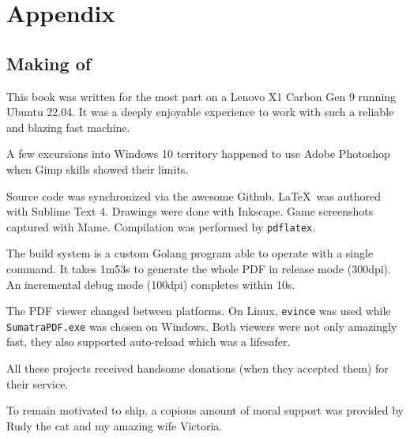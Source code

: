 \chapter{Appendix} 

\section{Making of}

This book was written for the most part on a Lenovo X1 Carbon Gen 9 running Ubuntu 22.04. It was a deeply enjoyable experience to work with such a reliable and blazing fast machine. 


A few excursions into Windows 10 territory happened to use Adobe Photoshop when Gimp skills showed their limits. 

Source code was synchronized via the awesome Github. \LaTeX\ was authored with Sublime Text 4. Drawings were done with Inkscape. Game screenshots captured with Mame. Compilation was performed by \texttt{pdflatex}.

The build system is a custom Golang program able to operate with a single  command. It takes 1m53s to generate the whole PDF in release mode (300dpi). An incremental debug mode (100dpi) completes within 10s. 

The PDF viewer changed between platforms. On Linux, \texttt{evince} was used while \texttt{SumatraPDF.exe} was chosen on Windows. Both viewers were not only amazingly fast, they also supported auto-reload which was a lifesafer. 

All these projects received handsome donations (when they accepted them) for their service.

To remain motivated to ship, a copious amount of moral support was provided by Rudy the cat and my amazing wife Victoria.
